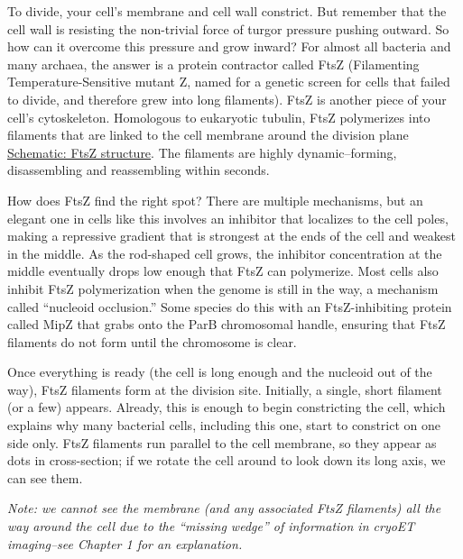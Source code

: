 \documentclass[]{tufte-book}
\begin{document}
To divide, your cell's membrane and cell wall constrict. But remember
that the cell wall is resisting the non-trivial force of turgor pressure
pushing outward. So how can it overcome this pressure and grow inward?
For almost all bacteria and many archaea, the answer is a protein
contractor called FtsZ (Filamenting Temperature-Sensitive mutant Z,
named for a genetic screen for cells that failed to divide, and
therefore grew into long filaments). FtsZ is another piece of your
cell's cytoskeleton. Homologous to eukaryotic tubulin, FtsZ polymerizes
into filaments that are linked to the cell membrane around the division
plane \protect\hyperlink{FtsZ_structure}{Schematic: FtsZ structure}. The
filaments are highly dynamic--forming, disassembling and reassembling
within seconds.

How does FtsZ find the right spot? There are multiple mechanisms, but an
elegant one in cells like this involves an inhibitor that localizes to
the cell poles, making a repressive gradient that is strongest at the
ends of the cell and weakest in the middle. As the rod-shaped cell
grows, the inhibitor concentration at the middle eventually drops low
enough that FtsZ can polymerize. Most cells also inhibit FtsZ
polymerization when the genome is still in the way, a mechanism called
``nucleoid occlusion.'' Some species do this with an FtsZ-inhibiting
protein called MipZ that grabs onto the ParB chromosomal handle,
ensuring that FtsZ filaments do not form until the chromosome is clear.

Once everything is ready (the cell is long enough and the nucleoid out
of the way), FtsZ filaments form at the division site. Initially, a
single, short filament (or a few) appears. Already, this is enough to
begin constricting the cell, which explains why many bacterial cells,
including this one, start to constrict on one side only. FtsZ filaments
run parallel to the cell membrane, so they appear as dots in
cross-section; if we rotate the cell around to look down its long axis,
we can see them.

\emph{Note: we cannot see the membrane (and any associated FtsZ
filaments) all the way around the cell due to the ``missing wedge'' of
information in cryoET imaging--see Chapter 1 for an explanation.}
\end{document}
